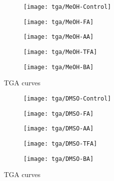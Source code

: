 \begin{figure}[htb]\ContinuedFloat{}
    \centering

    \begin{subfigure}{0.45\linewidth}
        \texttt{[image: tga/MeOH-Control]}%
        \label{appx:def:fgr:tga-meoh-cont}
    \end{subfigure}

    \begin{subfigure}{0.45\linewidth}
        \texttt{[image: tga/MeOH-FA]}%
        \label{appx:def:fgr:tga-meoh-fa}
    \end{subfigure}
    \begin{subfigure}{0.45\linewidth}
        \texttt{[image: tga/MeOH-AA]}%
        \label{appx:def:fgr:tga-meoh-aa}
    \end{subfigure}
    
    \begin{subfigure}{0.45\linewidth}
        \texttt{[image: tga/MeOH-TFA]}%
        \label{appx:def:fgr:tga-meoh-tfa}
    \end{subfigure}
    \begin{subfigure}{0.45\linewidth}
        \texttt{[image: tga/MeOH-BA]}%
        \label{appx:def:fgr:tga-meoh-ba}
    \end{subfigure}

    \caption{TGA curves}%
\end{figure}

\begin{figure}[htb]\ContinuedFloat{}
    \centering

    \begin{subfigure}{0.45\linewidth}
        \texttt{[image: tga/DMSO-Control]}%
        \label{appx:def:fgr:tga-dmso-cont}
    \end{subfigure}

    \begin{subfigure}{0.45\linewidth}
        \texttt{[image: tga/DMSO-FA]}%
        \label{appx:def:fgr:tga-dmso-fa}
    \end{subfigure}
    \begin{subfigure}{0.45\linewidth}
        \texttt{[image: tga/DMSO-AA]}%
        \label{appx:def:fgr:tga-dmso-aa}
    \end{subfigure}

    \begin{subfigure}{0.45\linewidth}
        \texttt{[image: tga/DMSO-TFA]}%
        \label{appx:def:fgr:tga-dmso-tfa}
    \end{subfigure}
    \begin{subfigure}{0.45\linewidth}
        \texttt{[image: tga/DMSO-BA]}%
        \label{appx:def:fgr:tga-dmso-ba}
    \end{subfigure}

    \caption{TGA curves}%
\end{figure}